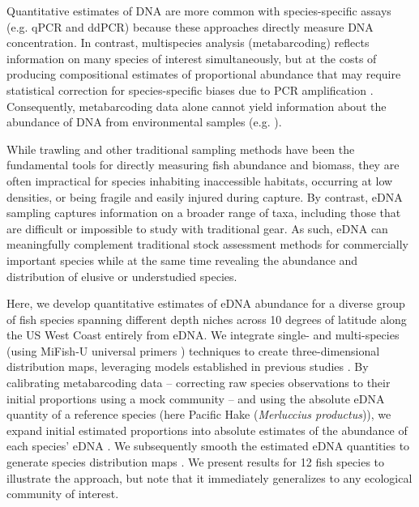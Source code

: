 \documentclass[9pt,twocolumn,twoside]{pnas-new}
\begin{document}
Quantitative estimates of DNA are more common with species-specific assays (e.g. qPCR and ddPCR) because these approaches directly measure DNA concentration. In contrast, multispecies analysis (metabarcoding) reflects information on many species of interest simultaneously, but at the costs of producing compositional estimates of proportional abundance \cite{gloor2017a, mclaren2019} that may require statistical correction for species-specific biases due to PCR amplification \cite{shelton2023}. Consequently, metabarcoding data alone cannot yield information about the abundance of DNA from environmental samples (e.g. \cite{guri2024a}).

While trawling and other traditional sampling methods have been the fundamental tools for directly measuring fish abundance and biomass, they are often impractical for species inhabiting inaccessible habitats, occurring at low densities, or being fragile and easily injured during capture. By contrast, eDNA sampling captures information on a broader range of taxa, including those that are difficult or impossible to study with traditional gear. As such, eDNA can meaningfully complement traditional stock assessment methods for commercially important species while at the same time revealing the abundance and distribution of elusive or understudied species.

Here, we develop quantitative estimates of eDNA abundance for a diverse group of fish species spanning different depth niches across 10 degrees of latitude along the US West Coast entirely from eDNA. We integrate single- and multi-species (using MiFish-U universal primers \cite{miya2015}) techniques to create three-dimensional distribution maps, leveraging models established in previous studies \cite{shelton2022, guri2024a, shelton2023, allan2023}. By calibrating metabarcoding data -- correcting raw species observations to their initial proportions using a mock community \cite{shelton2023} -- and using the absolute eDNA quantity of a reference species (here Pacific Hake (\textit{Merluccius productus})), we expand initial estimated proportions into absolute estimates of the abundance of each species’ eDNA \cite{guri2024a}. We subsequently smooth the estimated eDNA quantities to generate species distribution maps \cite{liu2023}. We present results for 12 fish species to illustrate the approach, but note that it immediately generalizes to any ecological community of interest.
\end{document}
